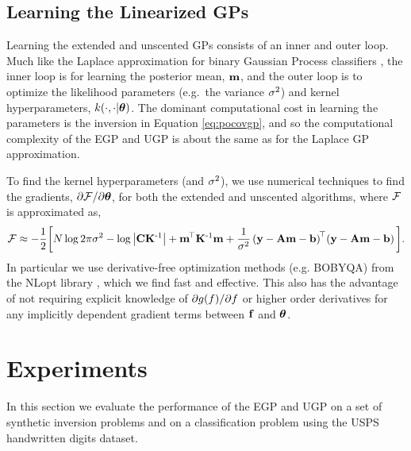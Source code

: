 \documentclass{article} %
\begin{document}
\subsection{Learning the Linearized GPs}

Learning the extended and unscented GPs consists of  an inner and outer loop.
Much like the Laplace approximation for binary Gaussian Process classifiers
\cite{Rasmussen2006}, the inner loop is for learning the posterior mean,
$\mathbf{m}$, and the outer loop is to optimize the likelihood parameters
(e.g.~the variance $\sigma^2$) and kernel hyperparameters,
$k\!\left({{\cdot}, {\cdot|\boldsymbol\theta}}\right)$. The dominant computational cost in learning
the parameters is the inversion in Equation \eqref{eq:pocovgp}, and so the
computational complexity of the EGP and UGP is about the same as for the
Laplace GP approximation.

To find the kernel hyperparameters (and $\sigma^2$), we use numerical techniques
to find the gradients, $\partial\mathcal{F}/\partial\boldsymbol\theta$, for both the extended
and unscented algorithms, where $\mathcal{F}$ is approximated as,
\begin{equation}
    \mathcal{F} \approx - \frac{1}{2} \bigg[
    N\log{2\pi\ensuremath{\sigma^2}} - \log\left|{\mathbf{C}\mathbf{K}^{\text{-}1}}\right|
    + \mathbf{m}^{\!\top}\mathbf{K}^{\text{-}1} \mathbf{m}
    + \frac{1}{\sigma^2}
        \left({\mathbf{y} - \mathbf{A}\mathbf{m} - \mathbf{b}}\right)^{\!\top}\!
        \left({\mathbf{y} - \mathbf{A}\mathbf{m} - \mathbf{b}}\right)
    \bigg].
    \label{eq:fengygp}
\end{equation}
In particular we use derivative-free optimization methods (e.g. BOBYQA)
from the NLopt library \cite{JohnsonNLOPT}, which we find fast and 
effective. This also has the advantage of not requiring explicit knowledge of
$\partial g\!\left({{f}}\right)\!/\partial f$ or higher order derivatives for
any implicitly dependent gradient terms between $\mathbf{f}$ and $\boldsymbol\theta$. 


\section{Experiments}
%
In this section we evaluate the performance of the EGP and UGP on a 
set of synthetic inversion problems and on a classification problem 
using the USPS handwritten digits dataset.
%
\label{sec:experiments}
%
%
%
\end{document}
